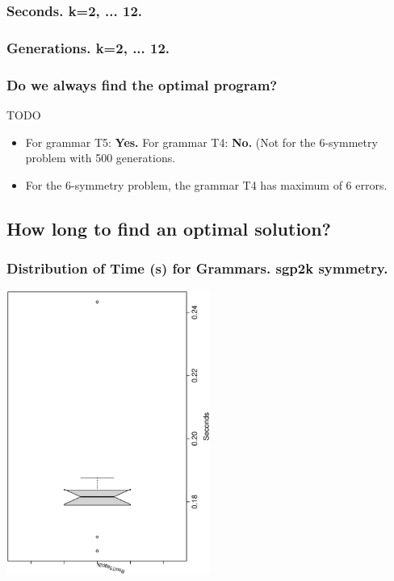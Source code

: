\documentclass[18pt,c]{beamer}
\begin{document}
 \begin{frame}
 \fontsize{8pt}{9pt}\selectfont
 \frametitle{ Seconds. k=2, ... 12. }

 \label{ExpFStatsTable001.tex}  
 \end{frame}

 \begin{frame}
 \fontsize{8pt}{9pt}\selectfont
 \frametitle{ Generations. k=2, ... 12. }

 \label{ExpFStatsTable002.tex}  
 \end{frame}

\begin{frame}
\frametitle{
Do we always find the optimal program?
}
TODO \begin{itemize}
\item For grammar T5: {\bf Yes.}
       For grammar T4: {\bf No.}
       (Not for the 6-symmetry problem with 500 generations.
\item For the 6-symmetry problem, the grammar T4 has maximum of 6 errors.
\end{itemize}
\end{frame}%
\clearpage
\subsection{How long to find an optimal solution?}
 \begin{frame}
 \frametitle{ Distribution of Time (s) for Grammars. sgp2k  symmetry. }
 \begin{center}
\includegraphics[width=0.5\textwidth, angle=-90]
{ExpFboxplottSeconds000.eps}
 \end{center}
 \label{ExpFboxplottSeconds000.eps}  
 \end{frame}
\end{document}

